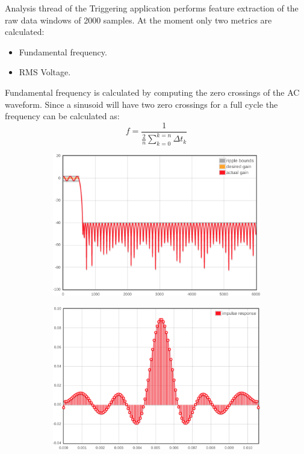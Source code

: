 Analysis thread of the Triggering application performs feature extraction of the raw data windows of 2000 samples. At the moment only two metrics are calculated:
\begin{itemize}
	\item Fundamental frequency.
	\item RMS Voltage.
\end{itemize}
Fundamental frequency is calculated by computing the zero crossings of the AC waveform. Since a sinusoid will have two zero crossings for a full cycle the frequency can be calculated as:
\begin{equation} \label{eq:1}
 f = \frac{1}{\frac{2}{n}\sum\limits_{k=0}^{k=n}{\Delta t_{k}}}  
\end{equation}

\begin{figure}[h]
	\centering
	\begin{subfigure}{.5\textwidth}
	  \centering
	  \includegraphics[width=0.9\linewidth]{img/filter1_gain.png}
	  \caption{}
	  \label{fig4:sub1}
	\end{subfigure}%
	\begin{subfigure}{.5\textwidth}
	  \centering
	  \includegraphics[width=0.9\linewidth]{img/filter1_response.png}
	  \caption{}
	  \label{fig4:sub2}
	\end{subfigure}


\end{figure}

